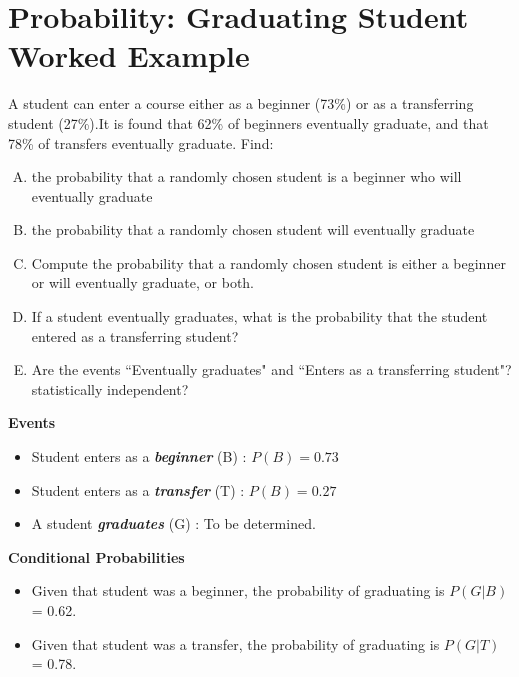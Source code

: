 \documentclass[a4paper,12pt]{article}
\begin{document}
\section*{Probability: Graduating Student Worked Example }
A student can enter a course either as a beginner (73\%) or as a transferring student (27\%).It is found that 62\% of beginners eventually graduate, and that 78\% of transfers eventually graduate. Find: 
\begin{enumerate}[(A)]
	\item the probability that a randomly chosen student is a beginner who will
	eventually graduate
	\item the probability that a randomly chosen student will eventually graduate
\item Compute the probability that a randomly chosen student is either a beginner or will
eventually graduate, or both.
\item If a student eventually graduates, what is the probability that the student entered
as a transferring student?
\item Are the events ``Eventually graduates" and ``Enters as a transferring student"?
statistically independent?
\end{enumerate}
\begin{framed}	
\noindent \textbf{Events}
	
	\begin{itemize}
		\item Student enters as a \textbf{\emph{beginner}} (B) : $P(B)=0.73$
		\item Student enters as a \textbf{\emph{transfer}} (T) : $P(B)=0.27$
		\item A student \textbf{\emph{graduates}} (G) : To be determined.
	\end{itemize}
\end{framed}
\textbf{Conditional Probabilities}
\begin{itemize}
	\item Given that student was a beginner, the probability of graduating is $P(G|B)$ = 0.62.
	\item Given that student was a transfer, the probability of graduating is $P(G|T)$ = 0.78.
\end{itemize}

\end{document}
